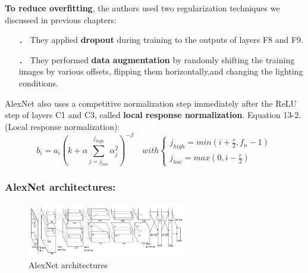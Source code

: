 \documentclass{beamer}
\begin{document}
    \begin{frame}
    \textbf{To reduce overfitting}, the authors used two regularization techniques we discussed in previous chapters:
        \begin{itemize}
            \item[．] They applied \textbf{dropout} during training to the outputs of layers F8 and F9.
            \item[．] They performed \textbf{data augmentation} by randomly shifting the training images by various offsets, flipping them horizontally,and changing the lighting conditions.
         \end{itemize}
    \end{frame}

    \begin{frame}
    AlexNet also uses a competitive normalization step immediately after the ReLU step of layers C1 and C3, called \textbf{local response normalization}.
        Equation 13-2.(Local response normalization):
        \begin{equation}
             b_i=a_i\left(k+\alpha\sum_{j=j_{low}}^{j_{high}}\alpha_j^2\right)^{-\beta}\quad with
             \left\{\begin{array}{lr}
                 j_{high}=min\left(i+\frac{r}{2},f_n-1\right)\\
                 j_{low}=max\left(0,i-\frac{r}{2}\right)
             \end{array}
            \right.
        \end{equation}
    \end{frame}

    \begin{frame}
    \frametitle{AlexNet architectures: }
        \begin{figure}[H]
            \begin{center}
                \includegraphics[width=7cm]{FIGURE13-2.png}
            \end{center}
        \caption{AlexNet architectures}
        \end{figure}
    \end{frame}
\end{document}
